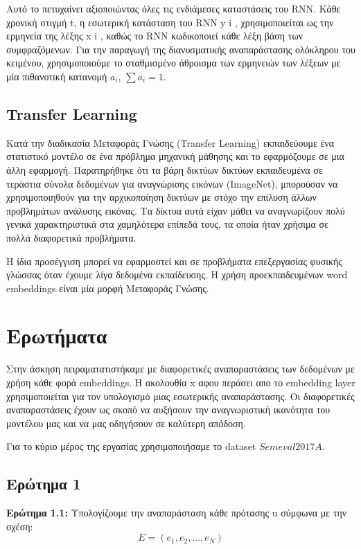 \documentclass[12pt]{article}
\begin{document}
Αυτό το πετυχαίνει αξιοποιώντας όλες τις ενδιάμεσες καταστάσεις του RNN.  Κάθε χρονική στιγμή t, η εσωτερική κατάσταση του RNN y i , χρησιμοποιείται ως την ερμηνεία της λέξης x i , καθώς το RNN κωδικοποιεί κάθε λέξη βάση των συμφραζόμενων. Για την παραγωγή της διανυσματικής
αναπαράστασης ολόκληρου του κειμένου, χρησιμοποιούμε το σταθμισμένο άθροισμα των ερμηνειών των λέξεων με μία πιθανοτική κατανομή $a_i$, $\sum a_i = 1$.



\subsection*{Transfer Learning}
Κατά την διαδικασία Μεταφοράς Γνώσης (Transfer Learning) εκπαιδεύουμε ένα στατιστικό μοντέλο σε ένα πρόβλημα μηχανική μάθησης και το εφαρμόζουμε σε
μια άλλη εφαρμογή. Παρατηρήθηκε ότι τα βάρη δικτύων δικτύων
εκπαιδευμένα σε τεράστια σύνολα δεδομένων για αναγνώρισης εικόνων (ImageNet), μπορούσαν να χρησιμοποιηθούν για την αρχικοποίηση δικτύων με στόχο την επίλυση άλλων προβλημάτων ανάλυσης εικόνας. Τα δίκτυα αυτά είχαν μάθει να αναγνωρίζουν πολύ γενικά χαρακτηριστικά στα χαμηλότερα επίπεδά τους, τα οποία ήταν χρήσιμα σε πολλά διαφορετικά προβλήματα.

Η ίδια προσέγγιση μπορεί να εφαρμοστεί και σε προβλήματα επεξεργασίας φυσικής γλώσσας όταν έχουμε λίγα δεδομένα εκπαίδευσης. Η χρήση προεκπαιδευμένων word embeddings είναι μία
μορφή Μεταφοράς Γνώσης. 




\section{Ερωτήματα}
Στην άσκηση πειραματατιστήκαμε με διαφορετικές αναπαραστάσεις των δεδομένων με χρήση κάθε φορά embeddings. Η ακολουθία x αφου περάσει απο το embedding layer χρησιμοποιείται για τον υπολογισμό μιας εσωτερικής αναπαράστασης. Οι διαφορετικές αναπαραστάσεις έχουν ως σκοπό να αυξήσουν την αναγνωριστική ικανότητα του μοντέλου μας και να μας οδηγήσουν σε καλύτερη απόδοση. 

Για το κύριο μέρος της εργασίας χρησιμοποιήσαμε το dataset $Semeval2017A$.

\subsection{Ερώτημα 1}
\textbf{Ερώτημα 1.1:}
Υπολογίζουμε την αναπαράσταση κάθε πρότασης u σύμφωνα με την σχέση:
$$ E = (e_1,e_2,...,e_N)$$
\end{document}
